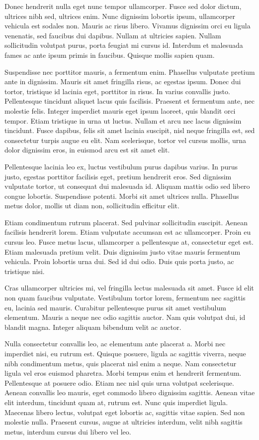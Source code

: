 Donec hendrerit nulla eget nunc tempor ullamcorper. Fusce sed dolor dictum, ultrices nibh sed, ultrices enim. Nunc dignissim lobortis ipsum, ullamcorper vehicula est sodales non. Mauris ac risus libero. Vivamus dignissim orci eu ligula venenatis, sed faucibus dui dapibus. Nullam at ultricies sapien. Nullam sollicitudin volutpat purus, porta feugiat mi cursus id. Interdum et malesuada fames ac ante ipsum primis in faucibus. Quisque mollis sapien quam.

Suspendisse nec porttitor mauris, a fermentum enim. Phasellus vulputate pretium ante in dignissim. Mauris sit amet fringilla risus, ac egestas ipsum. Donec dui tortor, tristique id lacinia eget, porttitor in risus. In varius convallis justo. Pellentesque tincidunt aliquet lacus quis facilisis. Praesent et fermentum ante, nec molestie felis. Integer imperdiet mauris eget ipsum laoreet, quis blandit orci tempor. Etiam tristique in urna ut luctus. Nullam et arcu nec lacus dignissim tincidunt. Fusce dapibus, felis sit amet lacinia suscipit, nisl neque fringilla est, sed consectetur turpis augue eu elit. Nam scelerisque, tortor vel cursus mollis, urna dolor dignissim eros, in euismod arcu est sit amet elit.

Pellentesque lacinia leo ex, luctus vestibulum purus dapibus varius. In purus justo, egestas porttitor facilisis eget, pretium hendrerit eros. Sed dignissim vulputate tortor, ut consequat dui malesuada id. Aliquam mattis odio sed libero congue lobortis. Suspendisse potenti. Morbi sit amet ultrices nulla. Phasellus metus dolor, mollis ut diam non, sollicitudin efficitur elit.

Etiam condimentum rutrum placerat. Sed pulvinar sollicitudin suscipit. Aenean facilisis hendrerit lorem. Etiam vulputate accumsan est ac ullamcorper. Proin eu cursus leo. Fusce metus lacus, ullamcorper a pellentesque at, consectetur eget est. Etiam malesuada pretium velit. Duis dignissim justo vitae mauris fermentum vehicula. Proin lobortis urna dui. Sed id dui odio. Duis quis porta justo, ac tristique nisi.

Cras ullamcorper ultricies mi, vel fringilla lectus malesuada sit amet. Fusce id elit non quam faucibus vulputate. Vestibulum tortor lorem, fermentum nec sagittis eu, lacinia sed mauris. Curabitur pellentesque purus sit amet vestibulum elementum. Mauris a neque nec odio sagittis auctor. Nam quis volutpat dui, id blandit magna. Integer aliquam bibendum velit ac auctor.

Nulla consectetur convallis leo, ac elementum ante placerat a. Morbi nec imperdiet nisi, eu rutrum est. Quisque posuere, ligula ac sagittis viverra, neque nibh condimentum metus, quis placerat nisl enim a neque. Nam consectetur ligula vel eros euismod pharetra. Morbi tempus enim et hendrerit fermentum. Pellentesque at posuere odio. Etiam nec nisl quis urna volutpat scelerisque. Aenean convallis leo mauris, eget commodo libero dignissim sagittis. Aenean vitae elit interdum, tincidunt quam at, rutrum est. Nunc quis imperdiet ligula. Maecenas libero lectus, volutpat eget lobortis ac, sagittis vitae sapien. Sed non molestie nulla. Praesent cursus, augue at ultricies interdum, velit nibh sagittis metus, interdum cursus dui libero vel leo.

